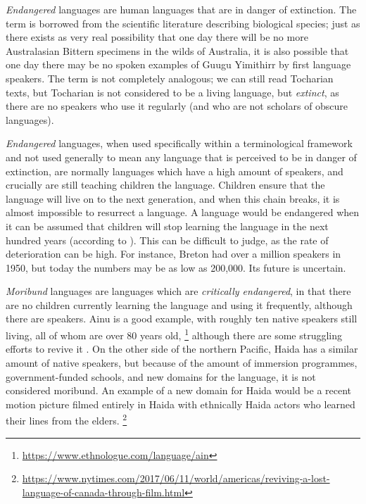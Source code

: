 \emph{Endangered} languages are human languages that are in danger of extinction. The term is borrowed from the scientific literature describing biological species; just as there exists as very real possibility that one day there will be no more Australasian Bittern specimens in the wilds of Australia, it is also possible that one day there may be no spoken examples of Guugu Yimithirr by first language speakers. The term is not completely analogous; we can still read Tocharian texts, but Tocharian is not considered to be a living language, but \textit{extinct}, as there are no speakers who use it regularly (and who are not scholars of obscure languages).

{\it Endangered} languages, when used specifically within a terminological framework and not used generally to mean any language that is perceived to be in danger of extinction, are normally languages which have a high amount of speakers, and crucially are still teaching children the language. Children ensure that the language will live on to the next generation, and when this chain breaks, it is almost impossible to resurrect a language. A language would be endangered when it can be assumed that children will stop learning the language in the next hundred years (according to \citet{krauss92}). This can be difficult to judge, as the rate of deterioration can be high. For instance, Breton had over a million speakers in 1950, but today the numbers may be as low as 200,000. Its future is uncertain.

\emph{Moribund} languages are languages which are {\it critically endangered}, in that there are no children currently learning the language and using it frequently, although there are speakers. Ainu is a good example, with roughly ten native speakers still living, all of whom are over 80 years old, \footnote{\href{https://www.ethnologue.com/language/ain}{https://www.ethnologue.com/language/ain}} although there are some struggling efforts to revive it \citep{hanks2017policy}. On the other side of the northern Pacific, Haida has a similar amount of native speakers, but because of the amount of immersion programmes, government-funded schools, and new domains for the language, it is not considered moribund. An example of a new domain for Haida would be a recent motion picture filmed entirely in Haida with ethnically Haida actors who learned their lines from the elders. \footnote{\href{https://www.nytimes.com/2017/06/11/world/americas/reviving-a-lost-language-of-canada-through-film.html}{https://www.nytimes.com/2017/06/11/world/americas/reviving-a-lost-language-of-canada-through-film.html}}

